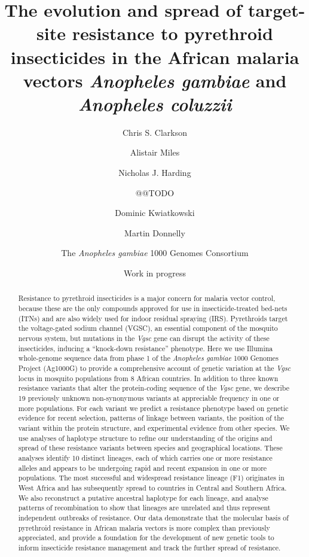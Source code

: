 \documentclass[a4paper,11pt,abstracton]{scrartcl}
\title{
The evolution and spread of target-site resistance to pyrethroid insecticides in the African malaria vectors \emph{Anopheles gambiae} and \emph{Anopheles coluzzii}
}
\date{Work in progress}
\author[1]{Chris S. Clarkson}
\author[2,1]{Alistair Miles}
\author[2]{Nicholas J. Harding}
\author{@@TODO}
\author[1,2]{Dominic Kwiatkowski}
\author[3,1]{Martin Donnelly}
\author[4]{The \emph{Anopheles gambiae} 1000 Genomes Consortium}
\affil[1]{Sanger @@TODO}
\affil[2]{Oxford @@TODO}
\affil[3]{Liverpool @@TODO}
\affil[4]{MalariaGEN @@TODO}
\begin{document}
\maketitle


\begin{abstract}


Resistance to pyrethroid insecticides is a major concern for malaria vector control, because these are the only compounds approved for use in insecticide-treated bed-nets (ITNs) and are also widely used for indoor residual spraying (IRS). 
%
Pyrethroids target the voltage-gated sodium channel (VGSC), an essential component of the mosquito nervous system, but mutations in the \emph{Vgsc} gene can disrupt the activity of these insecticides, inducing a ``knock-down resistance'' phenotype. 
%
Here we use Illumina whole-genome sequence data from phase 1 of the \emph{Anopheles gambiae} 1000 Genomes Project (Ag1000G) to provide a comprehensive account of genetic variation at the \emph{Vgsc} locus in mosquito populations from 8 African countries.
%
In addition to three known resistance variants that alter the protein-coding sequence of the \emph{Vgsc} gene, we describe 19 previously unknown non-synonymous variants at appreciable frequency in one or more populations.
%
For each variant we predict a resistance phenotype based on genetic evidence for recent selection, patterns of linkage between variants, the position of the variant within the protein structure, and experimental evidence from other species.
%
We use analyses of haplotype structure to refine our understanding of the origins and spread of these resistance variants between species and geographical locations.
%
These analyses identify 10 distinct lineages, each of which carries one or more resistance alleles and appears to be undergoing rapid and recent expansion in one or more populations.
%
The most successful and widespread resistance lineage (F1) originates in West Africa and has subsequently spread to countries in Central and Southern Africa.
%
We also reconstruct a putative ancestral haplotype for each lineage, and analyse patterns of recombination to show that lineages are unrelated and thus represent independent outbreaks of resistance.
%
Our data demonstrate that the molecular basis of pyrethroid resistance in African malaria vectors is more complex than previously appreciated, and provide a foundation for the development of new genetic tools to inform insecticide resistance management and track the further spread of resistance.

\end{abstract}
\end{document}
